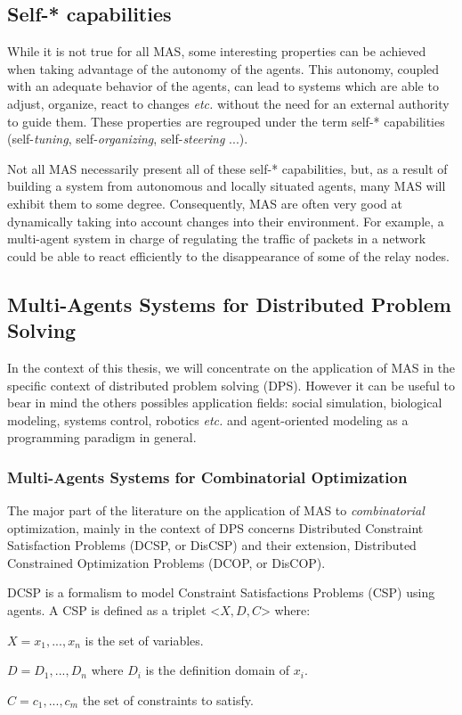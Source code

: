 \subsection{Self-* capabilities}

While it is not true for all MAS, some interesting properties can be achieved when taking advantage of the autonomy of the agents. This autonomy, coupled with an adequate behavior of the agents, can lead to systems which are able to adjust, organize, react to changes \emph{etc.} without the need for an external authority to guide them. These properties are regrouped under the term self-* capabilities (self-\emph{tuning}, self-\emph{organizing}, self-\emph{steering} ...).

Not all MAS necessarily present all of these self-* capabilities, but, as a result of building a system from autonomous and locally situated agents, many MAS will exhibit them to some degree. Consequently, MAS are often very good at dynamically taking into account changes into their environment. For example, a multi-agent system in charge of regulating the traffic of packets in a network could be able to react efficiently to the disappearance of some of the relay nodes.

\subsection{Multi-Agents Systems for Distributed Problem Solving}

In the context of this thesis, we will concentrate on the application of MAS in the specific context of distributed problem solving (DPS). However it can be useful to bear in mind the others possibles application fields: social simulation, biological modeling, systems control, robotics \emph{etc.} and agent-oriented modeling as a programming paradigm in general.

\subsubsection{Multi-Agents Systems for Combinatorial Optimization}

The major part of the literature on the application of MAS to \emph{combinatorial} optimization, mainly in the context of DPS concerns Distributed Constraint Satisfaction Problems (DCSP, or DisCSP) and their extension, Distributed Constrained Optimization Problems (DCOP, or DisCOP).

DCSP is a formalism to model Constraint Satisfactions Problems (CSP) using agents. A CSP is defined as a triplet <$X,D,C$> where:
\begin{compactitem}
\item $X = {x_1, ..., x_n}$ is the set of variables.
\item $D = {D_1, ..., D_n}$ where $D_i$ is the definition domain of $x_i$.
\item $C ={c_1, ..., c_m}$ the set of constraints to satisfy.
\end{compactitem}

